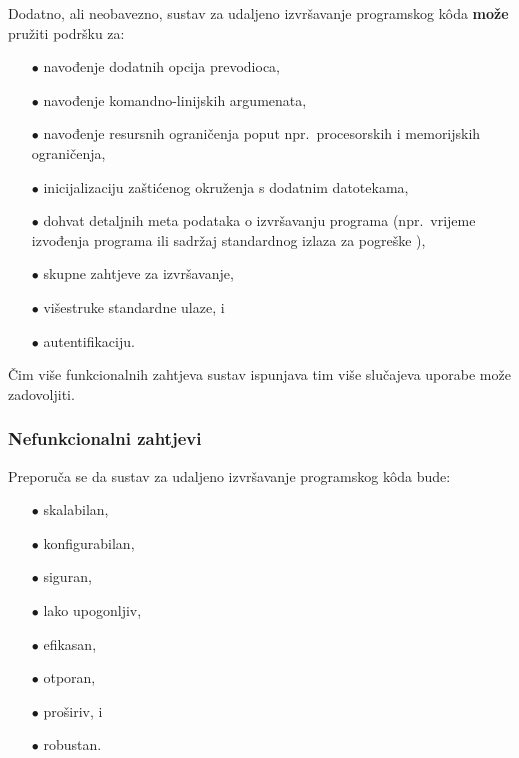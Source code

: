 \documentclass[times, utf8, diplomski]{fer}
\begin{document}
Dodatno, ali neobavezno, sustav za udaljeno izvršavanje programskog kôda \textbf{može} pružiti podršku za:
\begin{itemize}
    \item[$\bullet$] navođenje dodatnih opcija prevodioca,
    \item[$\bullet$] navođenje komandno-linijskih argumenata,
    \item[$\bullet$] navođenje resursnih ograničenja poput npr.\ procesorskih i memorijskih ograničenja,
    \item[$\bullet$] inicijalizaciju zaštićenog okruženja s dodatnim datotekama,
    \item[$\bullet$] dohvat detaljnih meta podataka o izvršavanju programa (npr.\ vrijeme izvođenja programa ili sadržaj standardnog izlaza za pogreške ),
    \item[$\bullet$] skupne zahtjeve za izvršavanje,
    \item[$\bullet$] višestruke standardne ulaze, i
    \item[$\bullet$] autentifikaciju.
\end{itemize}

Čim više funkcionalnih zahtjeva sustav ispunjava tim više slučajeva uporabe može zadovoljiti. \citep{9245310}

\subsubsection{Nefunkcionalni zahtjevi}
Preporuča se da sustav za udaljeno izvršavanje programskog kôda bude:
\begin{itemize}
    \item[$\bullet$] skalabilan,
    \item[$\bullet$] konfigurabilan,
    \item[$\bullet$] siguran,
    \item[$\bullet$] lako upogonljiv,
    \item[$\bullet$] efikasan,
    \item[$\bullet$] otporan,
    \item[$\bullet$] proširiv, i
    \item[$\bullet$] robustan.
\end{itemize}
\end{document}
